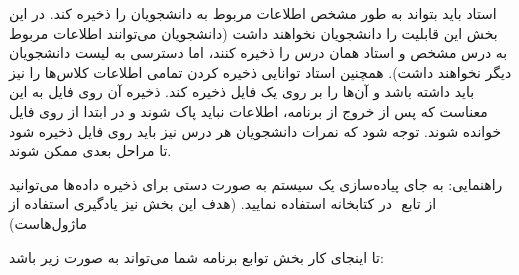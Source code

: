 استاد باید بتواند به طور مشخص اطلاعات مربوط به دانشجویان را ذخیره کند.  
در این بخش این قابلیت را دانشجویان نخواهند داشت (دانشجویان می‌توانند اطلاعات مربوط به درس مشخص و استاد همان درس را ذخیره کنند، اما دسترسی به لیست دانشجویان دیگر نخواهند داشت).  
همچنین استاد توانایی ذخیره کردن تمامی اطلاعات کلاس‌ها را نیز باید داشته باشد و آن‌ها را بر روی یک فایل ذخیره کند. ذخیره آن روی فایل به این معناست که پس از خروج از برنامه، اطلاعات نباید پاک شوند و در ابتدا از روی فایل خوانده شوند. توجه شود که نمرات دانشجویان هر درس نیز باید روی فایل ذخیره شود تا مراحل بعدی ممکن شوند.

راهنمایی:‌ به جای پیاده‌سازی یک سیستم به صورت دستی برای ذخیره داده‌ها می‌توانید از تابع ‌ در کتابخانه  استفاده نمایید. (هدف این بخش نیز یادگیری استفاده از ماژول‌هاست)

تا اینجای کار بخش توابع برنامه شما می‌تواند به صورت زیر باشد:

